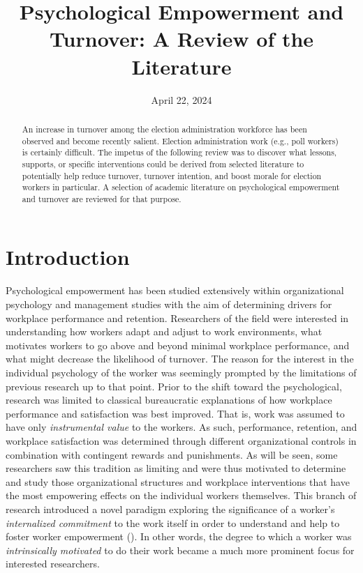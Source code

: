 \documentclass[
  11pt,
  a4paper,
]{article}
\title{Psychological Empowerment and Turnover: A Review of the
Literature}
\date{April 22, 2024}
\author{\sf{\Large\textbf{Isaiah Espinoza} \\\large Research
Assistant\\[0.5cm]}}
\makeatletter
\def\maketitle{\front{\expandafter{\@title}}{\@author}{\@organization}}
\makeatother
\begin{document}
\maketitle
\begin{abstract}
An increase in turnover among the election administration workforce has
been observed and become recently salient. Election administration work
(e.g., poll workers) is certainly difficult. The impetus of the
following review was to discover what lessons, supports, or specific
interventions could be derived from selected literature to potentially
help reduce turnover, turnover intention, and boost morale for election
workers in particular. A selection of academic literature on
psychological empowerment and turnover are reviewed for that purpose.
\end{abstract}

\section{Introduction}\label{introduction}

Psychological empowerment has been studied extensively within
organizational psychology and management studies with the aim of
determining drivers for workplace performance and retention. Researchers
of the field were interested in understanding how workers adapt and
adjust to work environments, what motivates workers to go above and
beyond minimal workplace performance, and what might decrease the
likelihood of turnover. The reason for the interest in the individual
psychology of the worker was seemingly prompted by the limitations of
previous research up to that point. Prior to the shift toward the
psychological, research was limited to classical bureaucratic
explanations of how workplace performance and satisfaction was best
improved. That is, work was assumed to have only \emph{instrumental
value} to the workers. As such, performance, retention, and workplace
satisfaction was determined through different organizational controls in
combination with contingent rewards and punishments. As will be seen,
some researchers saw this tradition as limiting and were thus motivated
to determine and study those organizational structures and workplace
interventions that have the most empowering effects on the individual
workers themselves. This branch of research introduced a novel paradigm
exploring the significance of a worker's \emph{internalized commitment}
to the work itself in order to understand and help to foster worker
empowerment (). In
other words, the degree to which a worker was \emph{intrinsically
motivated} to do their work became a much more prominent focus for
interested researchers.
\end{document}

